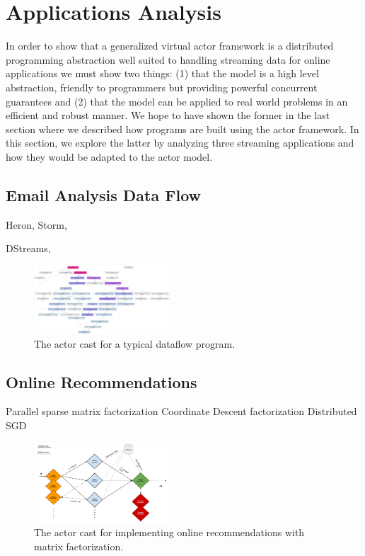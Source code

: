 \documentclass[conference,twocolumn,11pt]{IEEEtran}
\begin{document}
\section{Applications Analysis}

In order to show that a generalized virtual actor framework is a distributed programming abstraction well suited to handling streaming data for online applications we must show two things: (1) that the model is a high level abstraction, friendly to programmers but providing powerful concurrent guarantees and (2) that the model can be applied to real world problems in an efficient and robust manner. We hope to have shown the former in the last section where we described how programs are built using the actor framework. In this section, we explore the latter by analyzing three streaming applications and how they would be adapted to the actor model.



\subsection{Email Analysis Data Flow}

Heron, \cite{kulkarni_twitter_2015}
Storm, \cite{toshniwal_storm_2014}

DStreams, \cite{zaharia_discretized_2012}

\begin{figure}[!h]
    \centering
    \includegraphics[width=0.45\textwidth]{dataflow_cast}
    \caption{The actor cast for a typical dataflow program.}
    \label{fig:dataflow_cast}
\end{figure}

\subsection{Online Recommendations}

Parallel sparse matrix factorization \cite{gupta_highly_1997}
Coordinate Descent factorization \cite{yu_scalable_2012}
Distributed SGD \cite{gemulla_large-scale_2011}

\begin{figure}[!h]
    \centering
    \includegraphics[width=0.45\textwidth]{nnmf_cast}
    \caption{The actor cast for implementing online recommendations with matrix factorization.}
    \label{fig:nnmf_cast}
\end{figure}
\end{document}
